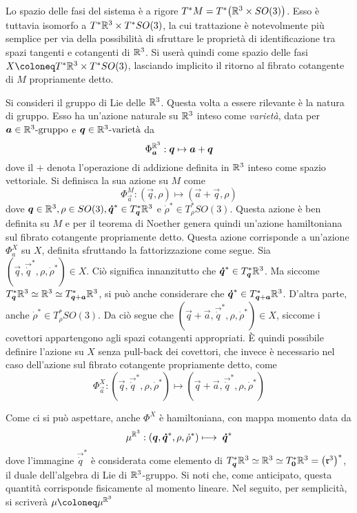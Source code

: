 Lo spazio delle fasi del sistema è a rigore $T^*M = T^*\big(\mathbb{R}^3 \times SO(3)\big)$. Esso è tuttavia isomorfo a $T^*\mathbb{R}^3 \times T^*SO(3)$, la cui trattazione è notevolmente più semplice per via della possibilità di sfruttare le proprietà di identificazione tra spazi tangenti e cotangenti di $\mathbb{R}^3$. Si userà quindi come spazio delle fasi $X \defeq T^*\R^3 \times T^*SO(3)$, lasciando implicito il ritorno al fibrato cotangente di $M$ propriamente detto.

Si consideri il gruppo di Lie delle  $\mathbb{R}^3$. Questa volta a essere rilevante è la natura di gruppo. Esso ha un'azione naturale su $\mathbb{R}^3$ inteso come \emph{varietà}, data per $\boldsymbol{a} \in \mathbb{R}^3\text{-gruppo}$ e $\boldsymbol{q} \in \mathbb{R}^3\text{-varietà}$ da
\begin{equation}
\Phi_{\boldsymbol{a}}^{\mathbb{R}^3}: \boldsymbol{q} \mapsto  \boldsymbol{a} + \boldsymbol{q}
\end{equation}
dove il $+$ denota l'operazione di addizione definita in $\mathbb{R}^3$ inteso come spazio vettoriale. Si definisca la sua azione su $M$ come 
\begin{equation}
  \Phi_{\vec{a}}^M: (\vec{q},\rho) \longmapsto (\vec{a} + \vec{q},\rho)
\end{equation}
dove $\boldsymbol{q} \in \mathbb{R}^3, \rho \in SO(3), \boldsymbol{\dot{q}}^* \in T^*_{\boldsymbol{q}}\mathbb{R}^3$ e $\dot{\rho}^* \in T^*_{\rho}SO(3)$. Questa azione è ben definita su $M$ e per il teorema di Noether genera quindi un'azione hamiltoniana sul fibrato cotangente propriamente detto. Questa azione corrisponde a un'azione $\Phi^X_a$ su $X$, definita sfruttando la fattorizzazione come segue. Sia $(\vec{q},\vec{\dot{q}}^*, \rho, \dot{\rho}^*) \in X$. Ciò significa innanzitutto che $\boldsymbol{\dot{q}}^* \in T^*_{\boldsymbol{q}}\mathbb{R}^3$. Ma siccome $T^*_{\boldsymbol{q}}\mathbb{R}^3 \simeq \mathbb{R}^3 \simeq T^*_{\boldsymbol{q}+\boldsymbol{a}}\mathbb{R}^3$, si può anche considerare che $\boldsymbol{\dot{q}}^* \in T^*_{\boldsymbol{q}+\boldsymbol{a}}\mathbb{R}^3$. D'altra parte, anche $\dot{\rho}^* \in  T^*_{\rho}SO(3)$. Da ciò segue che $(\vec{q} +\vec{a},\vec{\dot{q}}^*, \rho, \dot{\rho}^*) \in X$, siccome i covettori appartengono agli spazi cotangenti appropriati. È quindi possibile definire l'azione su $X$ senza pull-back dei covettori, che invece è necessario nel caso dell'azione sul fibrato cotangente propriamente detto, come 
\begin{equation}
\Phi^X_{\vec{a}}: (\vec{q},\vec{\dot{q}}^*, \rho, \dot{\rho}^*) \longmapsto (\vec{q}+ \vec{a},\vec{\dot{q}}^*, \rho, \dot{\rho}^*) 
\end{equation}  

Come ci si può aspettare, anche $\Phi^X$ è hamiltoniana, con mappa momento data da
\begin{equation}
\mu^{\mathbb{R}^3}: (\boldsymbol{q}, \boldsymbol{\dot{q}}^*, \rho, \dot{\rho}^*) \longmapsto\; \boldsymbol{\dot{q}}^*
\end{equation} 
dove l'immagine $\vec{\dot{q}}^*$ è considerata come elemento di $T^*_{\boldsymbol{q}}\mathbb{R}^3 \simeq \mathbb{R}^3 \simeq T^*_{\boldsymbol{0}}\mathbb{R}^3 = \big(\mathfrak{r}^{3}\big)^*$, il duale dell'algebra di Lie di $\mathbb{R}^3$-gruppo. Si noti che, come anticipato, questa quantità corrisponde fisicamente al momento lineare. Nel seguito, per semplicità, si scriverà $\mu \defeq \mu^{\R^3}$

